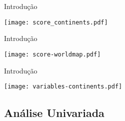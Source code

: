 \documentclass[xcolor=dvipsnames,table]{beamer}
\begin{document}
	\begin{frame}{Introdução}
		\begin{center}
    	\texttt{[image: score\_continents.pdf]}
  		\end{center}
	\end{frame}
	
	\begin{frame}{Introdução}
		\begin{center}
    	\texttt{[image: score-worldmap.pdf]}
  		\end{center}
	\end{frame}
	
	\begin{frame}{Introdução}
		\begin{center}
    	\texttt{[image: variables-continents.pdf]}
  		\end{center}
	\end{frame}
	
	\subsection{Análise Univariada}
	
\end{document}

